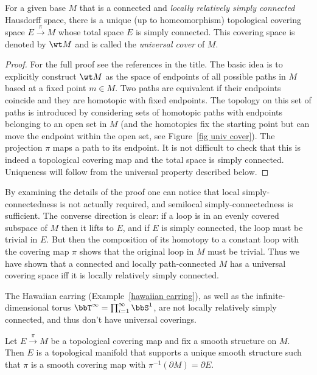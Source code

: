 \begin{thm}
    For a given base $M$ that is a connected and \emph{locally relatively simply connected} Hausdorff space, there is a unique (up to homeomorphism) topological covering space $E\overset{\pi}{\to}M$ whose total space $E$ is simply connected. This covering space is denoted by $\wt M$ and is called the \emph{universal cover} of $M$.
\end{thm}
\begin{proof}
    For the full proof see the references in the title. The basic idea is to explicitly construct $\wt M$ as the space of endpoints of all possible paths in $M$ based at a fixed point $m\in M$. Two paths are equivalent if their endpoints coincide and they are homotopic with fixed endpoints. The topology on this set of paths is introduced by considering sets of homotopic paths with endpoints belonging to an open set in $M$ (and the homotopies fix the starting point but can move the endpoint within the open set, see Figure~\ref{fig univ cover}). The projection $\pi$ maps a path to its endpoint. It is not difficult to check that this is indeed a topological covering map and the total space is simply connected. Uniqueness will follow from the universal property described below.
\end{proof}
\begin{rem}
    By examining the details of the proof one can notice that local simply-connectedness is not actually required, and semilocal simply-connectedness is sufficient. The converse direction is clear: if a loop is in an evenly covered subspace of $M$ then it lifts to $E$, and if $E$ is simply connected, the loop must be trivial in $E$. But then the composition of its homotopy to a constant loop with the covering map $\pi$ shows that the original loop in $M$ must be trivial. Thus we have shown that a connected and locally path-connected $M$ has a universal covering space iff it is locally relatively simply connected.
\end{rem}
\begin{example}
    The Hawaiian earring (Example~\ref{hawaiian earring}), as well as the infinite-dimensional torus $\bbT^\infty=\prod_{i=1}^\infty \bbS^1$, are not locally relatively simply connected, and thus don't have universal coverings.
\end{example}

\begin{thm}
Let $E\overset{\pi}{\to}M$ be a topological covering map and fix a smooth structure on $M$. Then $E$ is a topological manifold that supports a unique smooth structure such that $\pi$ is a smooth covering map with $\pi^{-1}(\partial M)=\partial E$.
\end{thm}

